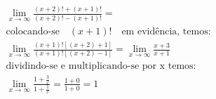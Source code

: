 \begin{ex}
\begin{align}
&\lim_{x\rightarrow \infty} \frac{(x+2)!+(x+1)!}{(x+2)!-(x+1)!}=\nonumber\\
&\text{colocando-se}\quad (x+1)!\quad\text{em evidência, temos:}\nonumber\\
&\lim_{x\rightarrow \infty} \frac{(x+1)![(x+2)+1]}{(x+1)![(x+2)-1]}=\lim_{x\rightarrow \infty} \frac{x+3}{x+1}\nonumber\\
&\text{dividindo-se e multiplicando-se por x temos:}\nonumber\\
&\lim_{x\rightarrow \infty} \frac{1+\frac{3}{x}}{1+\frac{1}{x}}=\frac{1+0}{1+0}=1\nonumber
\end{align}
\end{ex}